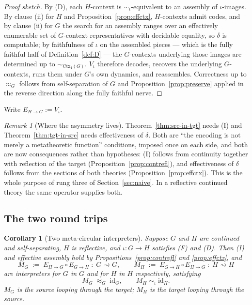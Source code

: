 \documentclass[11pt,a4paper]{article}
\theoremstyle{definition}
\theoremstyle{plain}
\newtheorem{corollary}[definition]{Corollary}
\theoremstyle{remark}
\newtheorem{remark}[definition]{Remark}
\newcommand{\Ctx}{\mathrm{Ctx}}
\newcommand{\bisim}{\approx}
\begin{document}
\begin{proof}[Proof sketch]
By (D), each $H$-context is $\sim_\iota$-equivalent to an assembly of $\iota$-images.
By clause (ii) for $H$ and Proposition~\ref{prop:effctx}, $H$-contexts admit codes, and by
clause (ii) for $G$ the search for an assembly ranges over an effectively enumerable set of
$G$-context representatives with decidable equality, so $\delta$ is computable; by faithfulness of $\iota$
on the assembled pieces --- which is the fully faithful half of
Definition~\ref{def:D} --- the $G$-contexts underlying those images are determined up
to $\sim_{\Ctx_1(G)}$. $V_\iota$ therefore decodes, recovers the underlying
$G$-contexts, runs them under $G$'s own dynamics, and reassembles. Correctness up to
$\bisim_G$ follows from self-separation of $G$ and Proposition~\ref{prop:preserve}
applied in the reverse direction along the fully faithful nerve.
\end{proof}

Write $E_{H\to G} := V_\iota$.

\begin{remark}[Where the asymmetry lives]
Theorem~\ref{thm:src-in-tgt} needs (I) and Theorem~\ref{thm:tgt-in-src} needs
effectiveness of $\delta$. Both are ``the encoding is not merely a metatheoretic
function'' conditions, imposed once on each side, and both are now consequences
rather than hypotheses: (I) follows from continuity together with reflection of the
target (Proposition~\ref{prop:contrefl}), and effectiveness of $\delta$ follows from
the sections of both theories (Proposition~\ref{prop:effctx}). This is the whole
purpose of rung three of Section~\ref{sec:naive}. In a reflective continued theory
the same operator supplies both.
\end{remark}

\subsection{The two round trips}

\begin{corollary}[Two meta-circular interpreters]
\label{cor:meta}
Suppose $G$ and $H$ are continued and self-separating, $H$ is reflective, and
$\iota : G \to H$ satisfies (F) and (D). Then (I) and effective assembly hold by
Propositions~\ref{prop:contrefl} and \ref{prop:effctx}, and
\[
M_G \;:=\; E_{H\to G} \circ E_{G\to H} \;:\; G \rightsquigarrow G,
\qquad
M_H \;:=\; E_{G\to H} \circ E_{H\to G} \;:\; H \rightsquigarrow H
\]
are interpreters for $G$ in $G$ and for $H$ in $H$ respectively, satisfying
\[
M_G \;\bisim_G\; \mathrm{id}_G,
\qquad
M_H \;\sim_\iota\; \mathrm{id}_H .
\]
$M_G$ is the source looping through the target; $M_H$ is the target looping through
the source.
\end{corollary}
\end{document}
